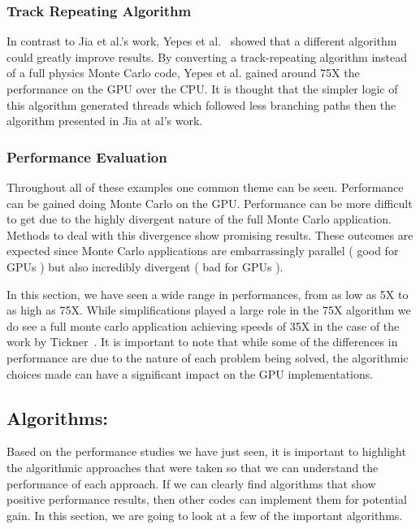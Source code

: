\subsubsection*{\textbf{Track Repeating Algorithm}}
In contrast to Jia et al.'s work, Yepes et al.~\cite{yepes2010gpu} showed that a different algorithm could greatly improve results.
%
By converting a track-repeating algorithm instead of a full physics Monte Carlo code, Yepes et al. gained around 75X the performance on the GPU over the CPU.
%
It is thought that the simpler logic of this algorithm generated threads which followed less branching paths then the algorithm presented in Jia at al's work.

\subsubsection*{\textbf{Performance Evaluation}}
Throughout all of these examples one common theme can be seen.
%
Performance can be gained doing Monte Carlo on the GPU.
%
Performance can be more difficult to get due to the highly divergent nature of the full Monte Carlo application.
%
Methods to deal with this divergence show promising results.
%
These outcomes are expected since Monte Carlo applications are embarrassingly parallel ( good for GPUs ) but also incredibly divergent ( bad for GPUs ).
%

In this section, we have seen a wide range in performances, from as low as 5X to as high as 75X.
%
While simplifications played a large role in the 75X algorithm we do see a full monte carlo application achieving speeds of 35X in the case of the work by Tickner~\cite{tickner2010monte}.
%
It is important to note that while some of the differences in performance are due to the nature of each problem being solved, the algorithmic choices made can have a significant impact on the GPU implementations.
%

\subsection*{Algorithms:}

Based on the performance studies we have just seen, it is important to highlight the algorithmic approaches that were taken so that we can understand the performance of each approach.
%
If we can clearly find algorithms that show positive performance results, then other codes can implement them for potential gain.
%
In this section, we are going to look at a few of the important algorithms.
%

